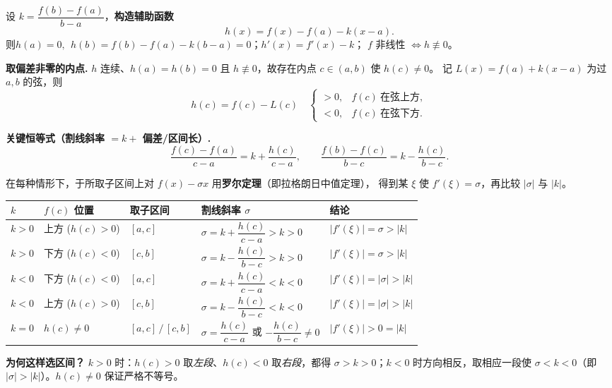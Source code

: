 \documentclass[11pt]{article}
\begin{document}
\begin{tcolorbox}[colback=boxbg,colframe=curve!70,breakable,
  title={\bfseries 辅助函数法：先构造 $h$，再分 $k$ 的符号与 $f(c)$ 的位置}]
\small
设 $k=\dfrac{f(b)-f(a)}{b-a}$，\textbf{构造辅助函数}
\[
h(x)=f(x)-f(a)-k(x-a).
\]
则\quad $h(a)=0,\ \ h(b)=f(b)-f(a)-k(b-a)=0$；\quad $h'(x)=f'(x)-k$；\quad
$f$ 非线性 $\iff h\not\equiv 0$。

\vspace{1mm}
\textbf{取偏差非零的内点.} $h$ 连续、$h(a)=h(b)=0$ 且 $h\not\equiv0$，故存在内点 $c\in(a,b)$ 使 $h(c)\neq0$。
记 $L(x)=f(a)+k(x-a)$ 为过 $a,b$ 的弦，则
\[
h(c)=f(c)-L(c)\quad\begin{cases}
>0, & f(c)\ \text{在弦上方},\\[1pt]
<0, & f(c)\ \text{在弦下方}.
\end{cases}
\]

\vspace{1mm}
\textbf{关键恒等式（割线斜率 $=k+$ 偏差/区间长）.}
\[
\frac{f(c)-f(a)}{c-a}=k+\frac{h(c)}{c-a},\qquad
\frac{f(b)-f(c)}{b-c}=k-\frac{h(c)}{b-c}. \tag{$\ast$}
\]
\end{tcolorbox}

\begin{tcolorbox}[colback=white,colframe=tang!80,breakable,
  title={\bfseries 分情况讨论：$k>0$ 或 $k<0$；再分 $f(c)$ 在弦上方或下方}]
\small
在每种情形下，于所取子区间上对 $f(x)-\sigma x$ 用\textbf{罗尔定理}（即拉格朗日中值定理），
得到某 $\xi$ 使 $f'(\xi)=\sigma$，再比较 $|\sigma|$ 与 $|k|$。

\vspace{1mm}
\renewcommand{\arraystretch}{1.35}
\begin{tabular}{>{\centering\arraybackslash}p{1.0cm} >{\centering\arraybackslash}p{2.5cm} >{\centering\arraybackslash}p{1.9cm} >{\centering\arraybackslash}p{4.1cm} >{\centering\arraybackslash}p{3.0cm}}
\toprule
$k$ & $f(c)$ 位置 & 取子区间 & 割线斜率 $\sigma$ & 结论\\
\midrule
$k>0$ & 上方 ($h(c)>0$) & $[a,c]$ & $\sigma=k+\dfrac{h(c)}{c-a}>k>0$ & $|f'(\xi)|=\sigma>|k|$\\
$k>0$ & 下方 ($h(c)<0$) & $[c,b]$ & $\sigma=k-\dfrac{h(c)}{b-c}>k>0$ & $|f'(\xi)|=\sigma>|k|$\\
$k<0$ & 下方 ($h(c)<0$) & $[a,c]$ & $\sigma=k+\dfrac{h(c)}{c-a}<k<0$ & $|f'(\xi)|=|\sigma|>|k|$\\
$k<0$ & 上方 ($h(c)>0$) & $[c,b]$ & $\sigma=k-\dfrac{h(c)}{b-c}<k<0$ & $|f'(\xi)|=|\sigma|>|k|$\\
$k=0$ & $h(c)\neq0$ & $[a,c]\,/\,[c,b]$ & $\sigma=\dfrac{h(c)}{c-a}$ 或 $-\dfrac{h(c)}{b-c}\neq0$ & $|f'(\xi)|>0=|k|$\\
\bottomrule
\end{tabular}

\vspace{0.5mm}
{\footnotesize\textbf{为何这样选区间？} $k>0$ 时：$h(c)>0$ 取\emph{左段}、$h(c)<0$ 取\emph{右段}，都得 $\sigma>k>0$；$k<0$ 时方向相反，取相应一段使 $\sigma<k<0$（即 $|\sigma|>|k|$）。$h(c)\neq0$ 保证严格不等号。\par}
\end{tcolorbox}
\end{document}
